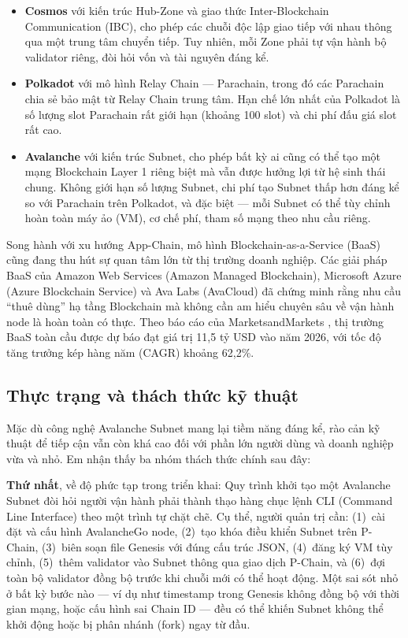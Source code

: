 \begin{itemize}
    \item \textbf{Cosmos} \cite{cosmos2019whitepaper} với kiến trúc Hub-Zone và giao thức Inter-Blockchain Communication (IBC), cho phép các chuỗi độc lập giao tiếp với nhau thông qua một trung tâm chuyển tiếp. Tuy nhiên, mỗi Zone phải tự vận hành bộ validator riêng, đòi hỏi vốn và tài nguyên đáng kể.

    \item \textbf{Polkadot} \cite{polkadot2016whitepaper} với mô hình Relay Chain --- Parachain, trong đó các Parachain chia sẻ bảo mật từ Relay Chain trung tâm. Hạn chế lớn nhất của Polkadot là số lượng slot Parachain rất giới hạn (khoảng 100 slot) và chi phí đấu giá slot rất cao.

    \item \textbf{Avalanche} \cite{avalabs2020platform} với kiến trúc Subnet, cho phép bất kỳ ai cũng có thể tạo một mạng Blockchain Layer 1 riêng biệt mà vẫn được hưởng lợi từ hệ sinh thái chung. Không giới hạn số lượng Subnet, chi phí tạo Subnet thấp hơn đáng kể so với Parachain trên Polkadot, và đặc biệt --- mỗi Subnet có thể tùy chỉnh hoàn toàn máy ảo (VM), cơ chế phí, tham số mạng theo nhu cầu riêng.
\end{itemize}

Song hành với xu hướng App-Chain, mô hình Blockchain-as-a-Service (BaaS) cũng đang thu hút sự quan tâm lớn từ thị trường doanh nghiệp. Các giải pháp BaaS của Amazon Web Services (Amazon Managed Blockchain), Microsoft Azure (Azure Blockchain Service) và Ava Labs (AvaCloud) đã chứng minh rằng nhu cầu ``thuê dùng'' hạ tầng Blockchain mà không cần am hiểu chuyên sâu về vận hành node là hoàn toàn có thực. Theo báo cáo của MarketsandMarkets \cite{marketsandmarkets2021baas}, thị trường BaaS toàn cầu được dự báo đạt giá trị 11,5 tỷ USD vào năm 2026, với tốc độ tăng trưởng kép hàng năm (CAGR) khoảng 62,2\%.

\subsection{Thực trạng và thách thức kỹ thuật}

Mặc dù công nghệ Avalanche Subnet mang lại tiềm năng đáng kể, rào cản kỹ thuật để tiếp cận vẫn còn khá cao đối với phần lớn người dùng và doanh nghiệp vừa và nhỏ. Em nhận thấy ba nhóm thách thức chính sau đây:

\textbf{Thứ nhất}, về độ phức tạp trong triển khai: Quy trình khởi tạo một Avalanche Subnet đòi hỏi người vận hành phải thành thạo hàng chục lệnh CLI (Command Line Interface) theo một trình tự chặt chẽ. Cụ thể, người quản trị cần: (1)~cài đặt và cấu hình AvalancheGo node, (2)~tạo khóa điều khiển Subnet trên P-Chain, (3)~biên soạn file Genesis với đúng cấu trúc JSON, (4)~đăng ký VM tùy chỉnh, (5)~thêm validator vào Subnet thông qua giao dịch P-Chain, và (6)~đợi toàn bộ validator đồng bộ trước khi chuỗi mới có thể hoạt động. Một sai sót nhỏ ở bất kỳ bước nào --- ví dụ như timestamp trong Genesis không đồng bộ với thời gian mạng, hoặc cấu hình sai Chain ID --- đều có thể khiến Subnet không thể khởi động hoặc bị phân nhánh (fork) ngay từ đầu.

